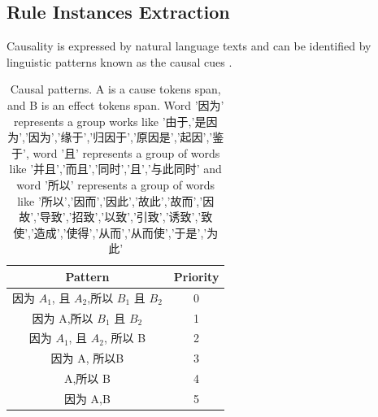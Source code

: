 \subsection{Rule Instances Extraction }
Causality is expressed by natural language texts and can be identified by linguistic patterns known as the causal cues \cite{chang2004causal}.

\begin{table}[htbp]
	\caption{Causal patterns. A is a cause tokens span, and B is an effect tokens span. Word '因为' represents a group works like '由于,'是因为','因为','缘于','归因于','原因是','起因','鉴于', word '且' represents a group of words like '并且','而且','同时','且','与此同时' and word '所以' represents a group of words like '所以','因而','因此','故此','故而','因故','导致','招致','以致','引致','诱致','致使','造成','使得','从而','从而使','于是','为此'}
	\begin{center}
		\begin{tabular}{|c|c|} \hline
			\textbf{Pattern}& \textbf{Priority}\\ \hline
			因为 $A_1$, 且 $A_2$,所以 $B_1$  且 $B_2$& 0\\ \hline
			因为 A,所以 $B_1$ 且 $B_2$&1\\ \hline
			因为 $A_1$, 且 $A_2$, 所以 B&2\\ \hline
			因为 A, 所以B&3\\ \hline
			A,所以 B&4\\ \hline
			因为 A,B&5\\ \hline
		\end{tabular}
		\label{tab:causal_pattern}
	\end{center}
\end{table}	

